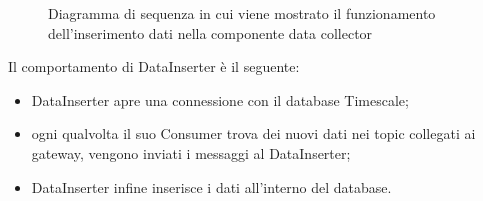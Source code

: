 \begin{landscape}
\begin{figure}[H]
				\caption{Diagramma di sequenza in cui viene mostrato il funzionamento dell'inserimento dati nella componente data collector}
				\label{Diagramma 8}
			\end{figure}
			Il comportamento di DataInserter è il seguente:
			\begin{itemize}
				\item DataInserter apre una connessione con il database Timescale;
				\item ogni qualvolta il suo Consumer trova dei nuovi dati nei topic collegati ai gateway, vengono inviati i messaggi al DataInserter;
				\item DataInserter infine inserisce i dati all'interno del database.
			\end{itemize}
	\end{landscape}